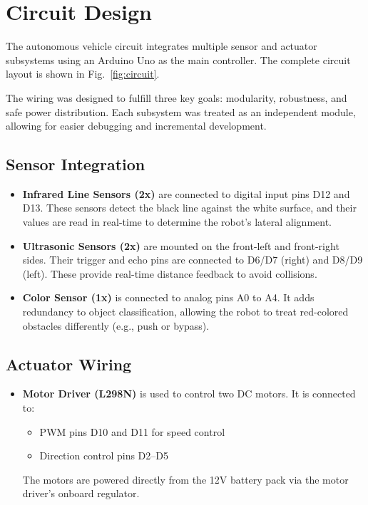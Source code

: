 \documentclass[conference]{IEEEtran}
\begin{document}
\section{Circuit Design}

The autonomous vehicle circuit integrates multiple sensor and actuator subsystems using an Arduino Uno as the main controller. The complete circuit layout is shown in Fig.~\ref{fig:circuit}.

The wiring was designed to fulfill three key goals: modularity, robustness, and safe power distribution. Each subsystem was treated as an independent module, allowing for easier debugging and incremental development.

\subsection{Sensor Integration}
\begin{itemize}
  \item \textbf{Infrared Line Sensors (2x)} are connected to digital input pins D12 and D13. These sensors detect the black line against the white surface, and their values are read in real-time to determine the robot's lateral alignment.
  
  \item \textbf{Ultrasonic Sensors (2x)} are mounted on the front-left and front-right sides. Their trigger and echo pins are connected to D6/D7 (right) and D8/D9 (left). These provide real-time distance feedback to avoid collisions.
  
  \item \textbf{Color Sensor (1x)} is connected to analog pins A0 to A4. It adds redundancy to object classification, allowing the robot to treat red-colored obstacles differently (e.g., push or bypass).
\end{itemize}

\subsection{Actuator Wiring}
\begin{itemize}
  \item \textbf{Motor Driver (L298N)} is used to control two DC motors. It is connected to:
  \begin{itemize}
    \item PWM pins D10 and D11 for speed control
    \item Direction control pins D2–D5
  \end{itemize}
  The motors are powered directly from the 12V battery pack via the motor driver's onboard regulator.
\end{itemize}
\end{document}
